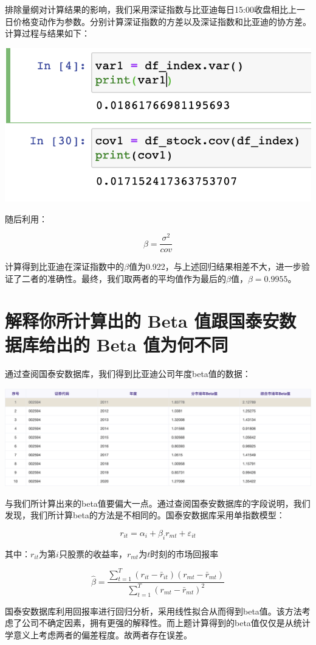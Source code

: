 \documentclass[UTF8]{ctexart}
\begin{document}
排除量纲对计算结果的影响，我们采用深证指数与比亚迪每日15:00收盘相比上一日价格变动作为参数。分别计算深证指数的方差以及深证指数和比亚迪的协方差。计算过程与结果如下：
\begin{center}
\includegraphics[scale=0.6]{截屏2021-06-16 下午9.46.35.png}
\end{center}\par
随后利用：\par
$$\beta = \frac{\sigma ^{2}}{cov}$$\par
计算得到比亚迪在深证指数中的$\beta$值为0.922，与上述回归结果相差不大，进一步验证了二者的准确性。最终，我们取两者的平均值作为最后的$\beta$值，$\beta=0.9955$。
\section{解释你所计算出的 Beta 值跟国泰安数据库给出的 Beta 值为何不同}
通过查阅国泰安数据库，我们得到比亚迪公司年度beta值的数据\cite{ref5}：\par
\begin{center}
\includegraphics[scale=0.3]{截屏2021-06-16 下午4.11.37.png}
\end{center}\par
与我们所计算出来的beta值要偏大一点。通过查阅国泰安数据库的字段说明，我们发现，我们所计算beta的方法是不相同的。国泰安数据库采用单指数模型\cite{ref4}：\par
$$r_{it} = \alpha_{i} + \beta_{i}r_{mt} + \varepsilon _{it}$$\par
其中：$r_{it}$为第$i$只股票的收益率，$r_{mt}$为$t$时刻的市场回报率\par
$$\hat{\beta} = \frac{\sum_{t=1}^{T} (r_{it}-\bar{r}_{it})(r_{mt}-\bar{r}_{mt})}{\sum_{t=1}^{T}(r_{mt}-\bar{r}_{mt})^{2} } $$\par
国泰安数据库利用回报率进行回归分析，采用线性拟合从而得到beta值。该方法考虑了公司不确定因素，拥有更强的解释性。而上题计算得到的beta值仅仅是从统计学意义上考虑两者的偏差程度。故两者存在误差\cite{ref1,ref2}。\par
\end{document}
